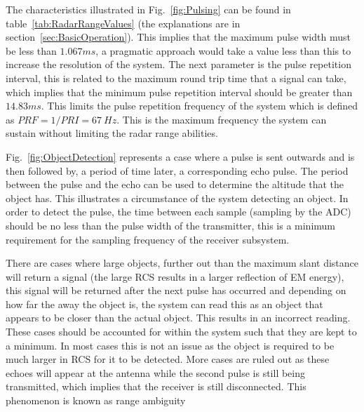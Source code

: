 \documentclass[11pt]{witseiepaper}
\begin{document}
\begin{bibunit}[witseie]
The characteristics illustrated in Fig.~\ref{fig:Pulsing} can be found in table~\ref{tab:RadarRangeValues} (the explanations are in section~\ref{sec:BasicOperation}). This implies that the maximum pulse width must be less than $1.067 ms$, a pragmatic approach would take a value less than this to increase the resolution of the system.
The next parameter is the pulse repetition interval, this is related to the maximum round trip time that a signal can take, which implies that the minimum pulse repetition interval should be greater than $14.83 ms$. This limits the pulse repetition frequency of the system which is defined as $PRF = 1/PRI = 67~Hz$. This is the maximum frequency the system can sustain without limiting the radar range abilities.

Fig.~\ref{fig:ObjectDetection} represents a case where a pulse is sent outwards and is then followed by, a period of time later, a corresponding echo pulse.
The period between the pulse and the echo can be used to determine the altitude that the object has. This illustrates a circumstance of the system detecting an object.
In order to detect the pulse, the time between each sample (sampling by the ADC) should be no less than the pulse width of the transmitter, this is a minimum requirement for the sampling frequency of the receiver subsystem.

There are cases where large objects, further out than the maximum slant distance will return a signal (the large RCS results in a larger reflection of EM energy), this signal will be returned after the next pulse has occurred and depending on how far the away the object is, the system can read this as an object that appears to be closer than the actual object. This results in an incorrect reading. These cases should be accounted for within the system such that they are kept to a minimum. In most cases this is not an issue as the object is required to be much larger in RCS for it to be detected. More cases are ruled out as these echoes will appear at the antenna while the second pulse is still being transmitted, which implies that the receiver is still disconnected.
This phenomenon is known as range ambiguity \cite[p.~22]{radarHandbook}


\end{bibunit}
\end{document}
